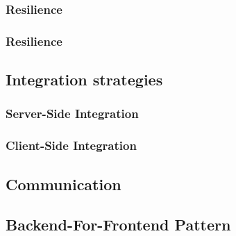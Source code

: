 \subsubsection{Resilience}



\subsubsection{Resilience}



\subsection{Integration strategies}

\subsubsection{Server-Side Integration}
\subsubsection{Client-Side Integration}

\subsection{Communication}

\subsection{Backend-For-Frontend Pattern}
